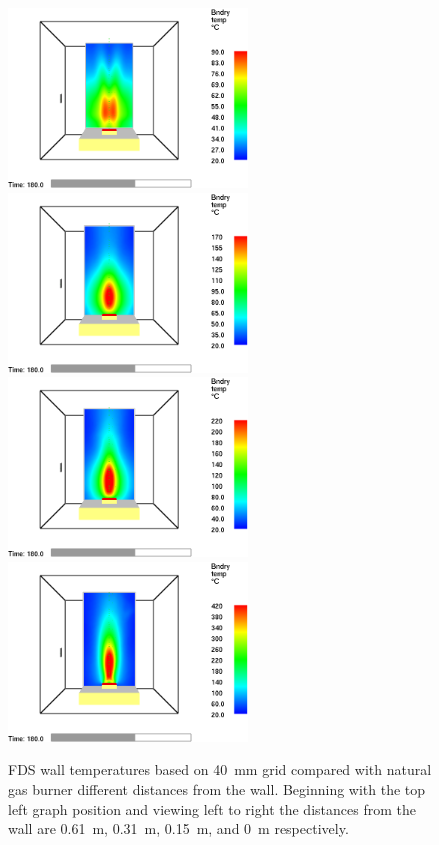 \documentclass[twoside]{uocthesis}
\begin{document}
\begin{figure}[h]
  \centering
  \includegraphics[width=2.5in]{../Figures/NG_80kW_GBWall_2D_RI=10_0300WT}
  \includegraphics[width=2.5in]{../Figures/NG_80kW_GBWall_1D_RI=10_0300WT}\\
  \includegraphics[width=2.5in]{../Figures/NG_80kW_GBWall_p5D_RI=10_0300WT}
  \includegraphics[width=2.5in]{../Figures/NG_80kW_GBWall_0D_RI=10_0300WT}\\
  \caption[FDS wall temperatures based on 40~mm grid compared with natural gas burner different distances from the wall]{FDS wall temperatures based on 40~mm grid compared with natural gas burner different distances from the wall. Beginning with the top left graph position and viewing left to right the distances from the wall are 0.61~m, 0.31~m, 0.15~m, and 0~m respectively.}
  \label{FDS_TCWall_IWGB_comp}
\end{figure}
\end{document}
